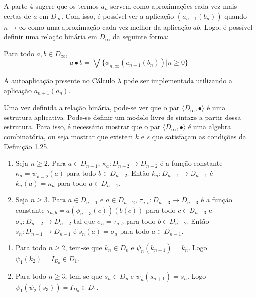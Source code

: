 \documentclass[../main.tex]{subfiles}
\begin{document}
A parte 4 sugere que os termos $a_n$ servem como aproximações cada vez mais certas de $a$ em $D_{\infty}$. Com isso, é possível ver a aplicação $(a_{n+1}(b_n))$ quando $n \to \infty$ como uma aproximação cada vez melhor da aplicação $ab$. Logo, é possível definir uma relação binária em $D_{\infty}$ da seguinte forma:

\begin{definition}
    Para todo $a, b \in D_{\infty}$, 
    $$a \bullet b = \bigvee \{ \phi_{n, \infty} (a_{n+1}(b_n)) | n \geq 0 \}$$
\end{definition}

A autoaplicação presente no Cálculo $\lambda$ pode ser implementada utilizando a aplicação $a_{n+1}(a_n)$.

Uma vez definida a relação binária, pode-se ver que o par $\langle D_{\infty}, \bullet \rangle$ é uma estrutura aplicativa. Pode-se definir um modelo livre de sintaxe a partir dessa estrutura. Para isso, é necessário mostrar que o par $\langle D_{\infty}, \bullet \rangle$ é uma algebra combinatória, ou seja mostrar que existem $k$ e $s$ que satisfaçam as condições da Definição 1.25.

\begin{definition}[$k_n, s_n$]
    \hfil
    \begin{enumerate}
        \item Seja $n \geq 2$. Para $a \in D_{n-1}$, $\kappa_a : D_{n-2} \to D_{n-2}$ é a função constante $\kappa_a = \psi_{n-2}(a)$ para todo $b \in D_{n-2}$. Então $k_n : D_{n-1} \to D_{n-1}$ é $k_n (a) = \kappa_a$ para todo $a \in D_{n-1}$.
        \item  Seja $n \geq 3$. Para $a \in D_{n-1}$ e $a \in D_{n-2}$, $\tau_{a, b} : D_{n-3} \to D_{n-3}$ é a função constante $\tau_{a, b} = a(\phi_{n-3}(c))(b(c))$ para todo $c \in D_{n-3}$ e $\sigma_a : D_{n-2} \to D_{n-2}$ tal que $\sigma_a = \tau_{a, b}$ para todo $b \in D_{n-2}$. Então $s_n : D_{n-1} \to D_{n-1}$ é $s_n (a) = \sigma_a$ para todo $a \in D_{n-1}$.
    \end{enumerate}
\end{definition}

\begin{lemma}
    \hfill
    \begin{enumerate}
        \item Para todo $n \geq 2$, tem-se que $k_n \in D_n$ e $\psi_n (k_{n+1}) = k_n$. Logo $\psi_1 (k_2) = I_{D_0} \in D_1$.
        \item Para todo $n \geq 3$, tem-se que $s_n \in D_n$ e $\psi_n (s_{n+1}) = s_n$. Logo $\psi_1 (\psi_2 (s_3)) = I_{D_0} \in D_1$.
    \end{enumerate}
\end{lemma}
\end{document}
